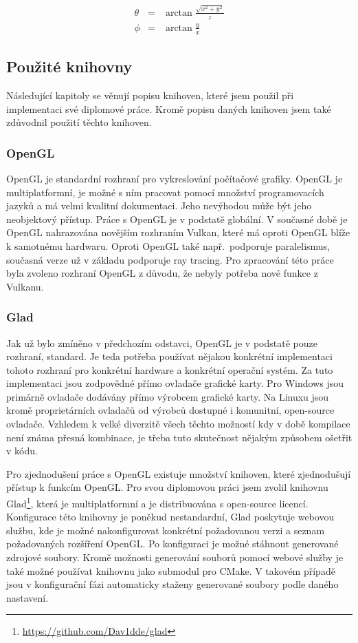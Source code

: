 \documentclass[czech,master]{diploma}
\begin{document}
\begin{eqnarray}
  \theta & = & \arctan \frac{\sqrt{x^2 + y^2}}{z} \nonumber \\
  \phi & = & \arctan \frac{y}{x}\label{eq:cartesianToSpherical}
\end{eqnarray}

\subsection{Použité knihovny}
Následující kapitoly se věnují popisu knihoven, které jsem použil při implementaci své diplomové práce. Kromě popisu daných knihoven jsem také zdůvodnil použití těchto knihoven.

\subsubsection{OpenGL}
OpenGL je standardní rozhraní pro vykreslování počítačové grafiky. OpenGL je multiplatformní, je možné s ním pracovat pomocí množství programovacích jazyků a má velmi kvalitní dokumentaci. Jeho nevýhodou může být jeho neobjektový přístup. Práce s OpenGL je v podstatě globální. V současné době je OpenGL nahrazována novějším rozhraním Vulkan, které má oproti OpenGL blíže k samotnému hardwaru. Oproti OpenGL také např.\ podporuje paralelismus, současná verze už v základu podporuje ray tracing. Pro zpracování této práce byla zvoleno rozhraní OpenGL z důvodu, že nebyly potřeba nové funkce z Vulkanu.

\subsubsection{Glad}
Jak už bylo zmíněno v předchozím odstavci, OpenGL je v podstatě pouze rozhraní, standard. Je teda potřeba používat nějakou konkrétní implementaci tohoto rozhraní pro konkrétní hardware a konkrétní operační systém. Za tuto implementaci jsou zodpovědné přímo ovladače grafické karty. Pro Windows jsou primárně ovladače dodávány přímo výrobcem grafické karty. Na Linuxu jsou kromě proprietárních ovladačů od výrobců dostupné i komunitní, open-source ovladače. Vzhledem k velké diverzitě všech těchto možností kdy v době kompilace není známa přesná kombinace, je třeba tuto skutečnost nějakým způsobem ošetřit v kódu. \par
Pro zjednodušení práce s OpenGL existuje množství knihoven, které zjednodušují přístup k funkcím OpenGL\@. Pro svou diplomovou práci jsem zvolil knihovnu Glad\footnote{\url{https://github.com/Dav1dde/glad}}, která je multiplatformní a je distribuována s open-source licencí. Konfigurace této knihovny je poněkud nestandardní, Glad poskytuje webovou službu, kde je možné nakonfigurovat konkrétní požadovanou verzi a seznam požadovaných rozšíření OpenGL\@. Po konfiguraci je možné stáhnout generované zdrojové soubory. Kromě možnosti generování souborů pomocí webové služby je také možné používat knihovnu jako submodul pro CMake. V takovém případě jsou v konfigurační fázi automaticky staženy generované soubory podle daného nastavení.
\end{document}
